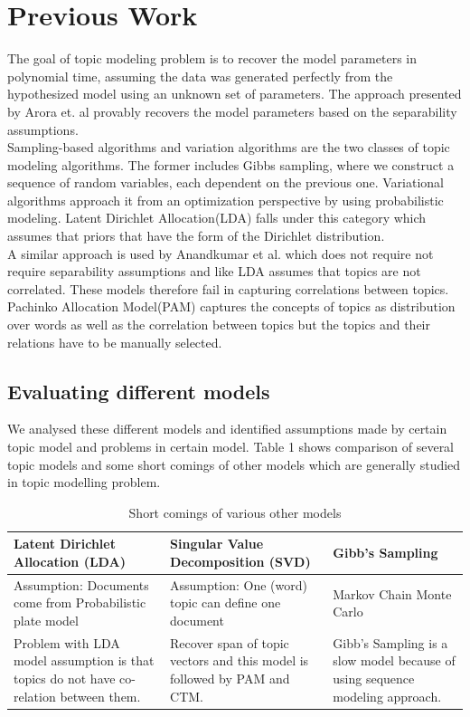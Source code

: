 \documentclass[a4paper,11pt]{article}
\begin{document}
\section{Previous Work}

The goal of topic modeling problem is to recover the model parameters in polynomial time, assuming the data was generated perfectly from the hypothesized model using an unknown set of parameters. The approach presented by Arora et. al \cite{tm} provably recovers the model parameters based on the separability assumptions. \\

Sampling-based algorithms and variation algorithms are the two classes of topic modeling algorithms. The former includes Gibbs sampling, where we construct a sequence of random variables, each dependent on the previous one. Variational algorithms approach it from an optimization perspective by using probabilistic modeling\cite{blei}. Latent Dirichlet Allocation(LDA) falls under this category which assumes that priors that have the form of the Dirichlet distribution.\\ 

A similar approach is used by Anandkumar et al\cite{anand12}. which does not require not require separability assumptions and like LDA assumes that topics are not correlated. These models therefore fail in capturing correlations between topics. Pachinko Allocation Model(PAM) captures the concepts of topics as distribution over words as well as the correlation between topics but the topics and their relations have to be manually selected\cite{pam}.

\subsection{Evaluating different models}
We analysed these different models and identified assumptions made by certain topic model and problems in certain model. Table 1 shows comparison of several topic models and some short comings of other models which are generally studied in topic modelling problem.


\begin{table}
    \begin{tabular}{ | p{6cm} | p{5.5cm} | p{4cm}  |}
    \hline
    Latent Dirichlet Allocation (LDA) & Singular Value Decomposition (SVD) & Gibb's Sampling  \\ \hline \hline
   Assumption:  Documents come from Probabilistic plate model & Assumption: One (word) topic can define one document & Markov Chain Monte Carlo  \\ \hline 
    Problem with LDA model assumption is that topics do not have co-relation between them. & Recover span of topic vectors and this model is followed by PAM and CTM. & Gibb's Sampling is a slow model because of using sequence modeling approach. \\ \hline
    \end{tabular}
    \caption {Short comings of various other models}
    \label{table:comparison}
\end{table}
\end{document}

